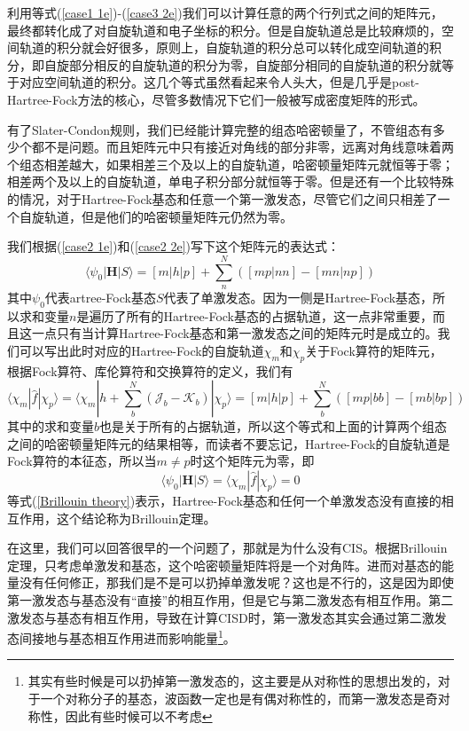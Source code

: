 \documentclass[12pt,a4paper,openany,twoside]{book}
\numberwithin{equation}{section}
\begin{document}
          利用等式(\ref{case1 1e})-(\ref{case3 2e})我们可以计算任意的两个行列式之间的矩阵元，最终都转化成了对自旋轨道和电子坐标的积分。但是自旋轨道总是比较麻烦的，空间轨道的积分就会好很多，原则上，自旋轨道的积分总可以转化成空间轨道的积分，即自旋部分相反的自旋轨道的积分为零，自旋部分相同的自旋轨道的积分就等于对应空间轨道的积分。这几个等式虽然看起来令人头大，但是几乎是post-Hartree-Fock方法的核心，尽管多数情况下它们一般被写成密度矩阵的形式。

          有了Slater-Condon规则，我们已经能计算完整的组态哈密顿量了，不管组态有多少个都不是问题。而且矩阵元中只有接近对角线的部分非零，远离对角线意味着两个组态相差越大，如果相差三个及以上的自旋轨道，哈密顿量矩阵元就恒等于零；相差两个及以上的自旋轨道，单电子积分部分就恒等于零。但是还有一个比较特殊的情况，对于Hartree-Fock基态和任意一个第一激发态，尽管它们之间只相差了一个自旋轨道，但是他们的哈密顿量矩阵元仍然为零。

          我们根据(\ref{case2 1e})和(\ref{case2 2e})写下这个矩阵元的表达式：
          \begin{equation}
            \langle\psi_0|\mathbf{H}|S\rangle = [m|h| p]+\sum_{n}^{N}\left([m p | n n]-[m n | n p]\right)
          \end{equation}
          其中$\psi_0$代表artree-Fock基态$S$代表了单激发态。因为一侧是Hartree-Fock基态，所以求和变量$n$是遍历了所有的Hartree-Fock基态的占据轨道，这一点非常重要，而且这一点只有当计算Hartree-Fock基态和第一激发态之间的矩阵元时是成立的。我们可以写出此时对应的Hartree-Fock的自旋轨道$\chi_m$和$\chi_p$关于Fock算符的矩阵元，根据Fock算符、库伦算符和交换算符的定义，我们有
          \begin{equation}
            \langle \chi_m|\hat{f}|\chi_p\rangle = \langle \chi_m|h + \sum_b^N (\mathscr{J}_b - \mathscr{K}_b)|\chi_p\rangle = [m|h| p]+\sum_{b}^{N}\left([m p | b b]-[m b | b p]\right)
          \end{equation}
          其中的求和变量$b$也是关于所有的占据轨道，所以这个等式和上面的计算两个组态之间的哈密顿量矩阵元的结果相等，而读者不要忘记，Hartree-Fock的自旋轨道是Fock算符的本征态，所以当$m\neq p$时这个矩阵元为零，即
          \begin{equation}
            \langle\psi_0|\mathbf{H}|S\rangle = \langle \chi_m|\hat{f}|\chi_p\rangle = 0
            \label{Brillouin theory}
          \end{equation}
          等式(\ref{Brillouin theory})表示，Hartree-Fock基态和任何一个单激发态没有直接的相互作用，这个结论称为Brillouin定理。

          在这里，我们可以回答很早的一个问题了，那就是为什么没有CIS。根据Brillouin定理，只考虑单激发和基态，这个哈密顿量矩阵将是一个对角阵。进而对基态的能量没有任何修正，那我们是不是可以扔掉单激发呢？这也是不行的，这是因为即使第一激发态与基态没有“直接”的相互作用，但是它与第二激发态有相互作用。第二激发态与基态有相互作用，导致在计算CISD时，第一激发态其实会通过第二激发态间接地与基态相互作用进而影响能量\footnote{其实有些时候是可以扔掉第一激发态的，这主要是从对称性的思想出发的，对于一个对称分子的基态，波函数一定也是有偶对称性的，而第一激发态是奇对称性，因此有些时候可以不考虑}。
\end{document}
